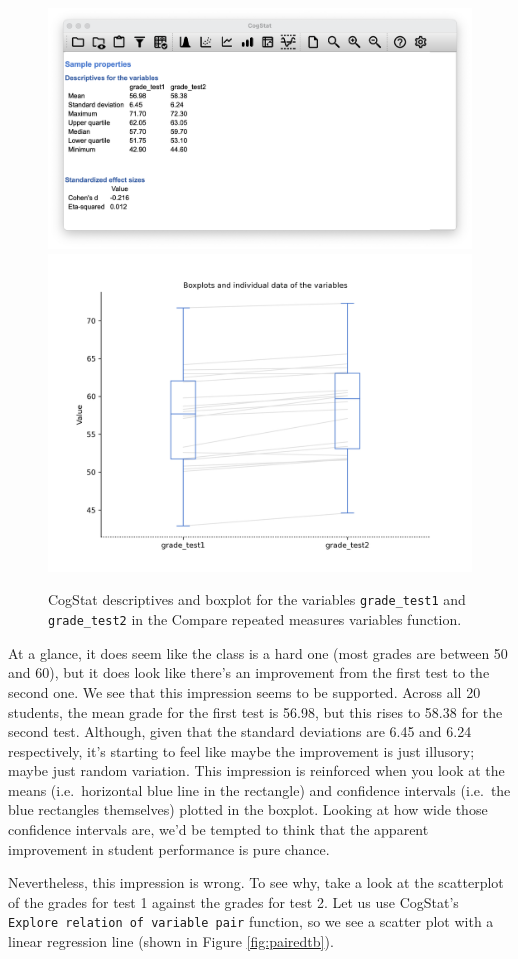 \documentclass[
  11pt,
  a4paper,
  twoside,symmetric,openright]{book}
\theoremstyle{break}
\theoremstyle{break}
\begin{document}
\begin{figure}

{\centering \includegraphics[width=0.6\linewidth]{resources/image/cogstatchicodescr} \includegraphics[width=0.6\linewidth]{resources/image/cogstatchicoboxplot} 

}

\caption{CogStat descriptives and boxplot for the variables \texttt{grade\_test1} and \texttt{grade\_test2} in the Compare repeated measures variables function.}\label{fig:chico}
\end{figure}

At a glance, it does seem like the class is a hard one (most grades are between 50 and 60), but it does look like there's an improvement from the first test to the second one. We see that this impression seems to be supported. Across all 20 students, the mean grade for the first test is 56.98, but this rises to 58.38 for the second test. Although, given that the standard deviations are 6.45 and 6.24 respectively, it's starting to feel like maybe the improvement is just illusory; maybe just random variation. This impression is reinforced when you look at the means (i.e.~horizontal blue line in the rectangle) and confidence intervals (i.e.~the blue rectangles themselves) plotted in the boxplot. Looking at how wide those confidence intervals are, we'd be tempted to think that the apparent improvement in student performance is pure chance.

Nevertheless, this impression is wrong. To see why, take a look at the scatterplot of the grades for test 1 against the grades for test 2. Let us use CogStat's \texttt{Explore\ relation\ of\ variable\ pair} function, so we see a scatter plot with a linear regression line (shown in Figure \ref{fig:pairedtb}).
\end{document}
